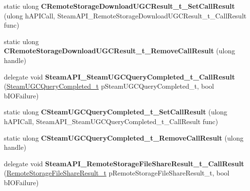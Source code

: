 \begin{DoxyCompactItemize}
static ulong {\bfseries C\+Remote\+Storage\+Download\+U\+G\+C\+Result\+\_\+t\+\_\+\+Set\+Call\+Result} (ulong h\+A\+P\+I\+Call, Steam\+A\+P\+I\+\_\+\+Remote\+Storage\+Download\+U\+G\+C\+Result\+\_\+t\+\_\+\+Call\+Result func)
\item 
\mbox{\label{class_valve_1_1_interop_1_1_native_entrypoints_a53e662a34824d54886c5373ec623563f}} 
static ulong {\bfseries C\+Remote\+Storage\+Download\+U\+G\+C\+Result\+\_\+t\+\_\+\+Remove\+Call\+Result} (ulong handle)
\item 
\mbox{\label{class_valve_1_1_interop_1_1_native_entrypoints_abe2ec26b6f0fc9e82ab779af2043bfde}} 
delegate void {\bfseries Steam\+A\+P\+I\+\_\+\+Steam\+U\+G\+C\+Query\+Completed\+\_\+t\+\_\+\+Call\+Result} (\hyperlink{struct_valve_1_1_steamworks_1_1_steam_u_g_c_query_completed__t}{Steam\+U\+G\+C\+Query\+Completed\+\_\+t} p\+Steam\+U\+G\+C\+Query\+Completed\+\_\+t, bool b\+I\+O\+Failure)
\item 
\mbox{\label{class_valve_1_1_interop_1_1_native_entrypoints_a1d713c48ad3a8277a6c28affee40f4d7}} 
static ulong {\bfseries C\+Steam\+U\+G\+C\+Query\+Completed\+\_\+t\+\_\+\+Set\+Call\+Result} (ulong h\+A\+P\+I\+Call, Steam\+A\+P\+I\+\_\+\+Steam\+U\+G\+C\+Query\+Completed\+\_\+t\+\_\+\+Call\+Result func)
\item 
\mbox{\label{class_valve_1_1_interop_1_1_native_entrypoints_a345aeed7584311c6f93ae1253396e170}} 
static ulong {\bfseries C\+Steam\+U\+G\+C\+Query\+Completed\+\_\+t\+\_\+\+Remove\+Call\+Result} (ulong handle)
\item 
\mbox{\label{class_valve_1_1_interop_1_1_native_entrypoints_a7de0629a35526f82edbac5c51acc3e6e}} 
delegate void {\bfseries Steam\+A\+P\+I\+\_\+\+Remote\+Storage\+File\+Share\+Result\+\_\+t\+\_\+\+Call\+Result} (\hyperlink{struct_valve_1_1_steamworks_1_1_remote_storage_file_share_result__t}{Remote\+Storage\+File\+Share\+Result\+\_\+t} p\+Remote\+Storage\+File\+Share\+Result\+\_\+t, bool b\+I\+O\+Failure)
\item 
\mbox{\label{class_valve_1_1_interop_1_1_native_entrypoints_ab861f8ba58df978f0c69cc2fdac0a53a}} 

\end{DoxyCompactItemize}
